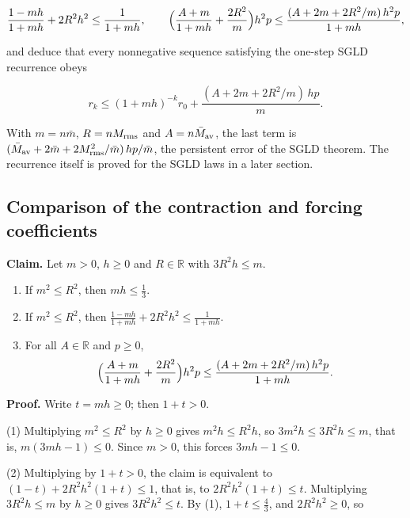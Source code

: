 \documentclass[11pt,a4paper]{report}
\begin{document}
\[\frac{1-mh}{1+mh}+2R^2h^2\le\frac1{1+mh},\qquad\Bigl(\frac{A+m}{1+mh}+\frac{2R^2}m\Bigr)h^2p\le\frac{(A+2m+2R^2/m)\,h^2p}{1+mh},\]


and deduce that every nonnegative sequence satisfying the one-step SGLD recurrence obeys


\[r_k\le(1+mh)^{-k}r_0+\frac{(A+2m+2R^2/m)\,hp}{m}.\]


With \(m=n\bar m\), \(R=nM_{\rm rms}\) and \(A=n\bar M_{\rm av}\), the last term is \((\bar M_{\rm av}+2\bar m+2M_{\rm rms}^2/\bar m)\,hp/\bar m\), the persistent error of the SGLD theorem. The recurrence itself is proved for the SGLD laws in a later section.

\subsection{\texorpdfstring{Comparison of the contraction and forcing coefficients}{Comparison of the contraction and forcing coefficients}}
\label{report-step-AverageLMC-SGLDRecurrence-lean-1}


\textbf{Claim.} Let \(m>0\), \(h\ge0\) and \(R\in\mathbb R\) with \(3R^2h\le m\).



\begin{enumerate}


\item If \(m^2\le R^2\), then \(mh\le\frac13\).

\item If \(m^2\le R^2\), then \(\displaystyle\frac{1-mh}{1+mh}+2R^2h^2\le\frac1{1+mh}\).

\item For all \(A\in\mathbb R\) and \(p\ge0\),
\[\Bigl(\frac{A+m}{1+mh}+\frac{2R^2}m\Bigr)h^2p\le\frac{(A+2m+2R^2/m)\,h^2p}{1+mh}.\]

\end{enumerate}



\textbf{Proof.} Write \(t=mh\ge0\); then \(1+t>0\).




(1) Multiplying \(m^2\le R^2\) by \(h\ge0\) gives \(m^2h\le R^2h\), so \(3m^2h\le3R^2h\le m\), that is, \(m(3mh-1)\le0\). Since \(m>0\), this forces \(3mh-1\le0\).




(2) Multiplying by \(1+t>0\), the claim is equivalent to \((1-t)+2R^2h^2(1+t)\le1\), that is, to \(2R^2h^2(1+t)\le t\). Multiplying \(3R^2h\le m\) by \(h\ge0\) gives \(3R^2h^2\le t\). By (1), \(1+t\le\frac43\), and \(2R^2h^2\ge0\), so
\end{document}
